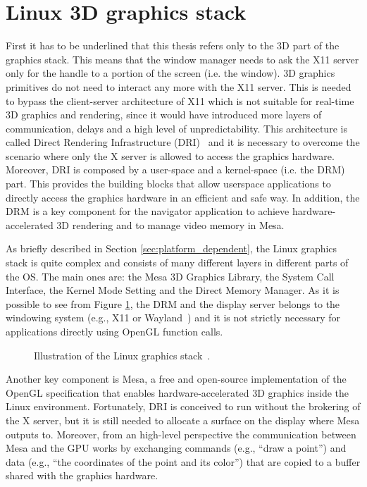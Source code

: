 \section{Linux 3D graphics stack}
First it has to be underlined that this thesis refers only to the 3D part of the
graphics stack. This means that the window manager needs to ask the X11 server
only for the handle to a portion of the screen (i.e. the window).
3D graphics primitives do not need to interact any more with the X11 server. This
is needed to bypass the client-server architecture of X11 which is not suitable for
real-time 3D graphics and rendering, since it would have introduced more layers
of communication, delays and a high level of unpredictability.
This architecture is called
Direct Rendering Infrastructure (DRI)~\cite{paul2000introduction} and it is
necessary to overcome the scenario where only the X server is allowed to access
the graphics hardware. Moreover, DRI is composed by a user-space and a kernel-space
(i.e. the DRM) part. This provides the building blocks that allow userspace applications
to directly access the graphics hardware in an efficient and safe way.
In addition, the DRM is a key component for the navigator application to achieve
hardware-accelerated 3D rendering and to manage video memory in Mesa.

As briefly described in Section \ref{sec:platform_dependent}, the Linux graphics
stack is quite complex and consists of many different layers in different parts
of the OS. The main ones are: the Mesa 3D Graphics Library, the System Call
Interface, the Kernel Mode Setting and the Direct Memory Manager.
As it is possible to see from Figure \ref{img:linux_graphics_stack}, the DRM and 
the display server belongs to the windowing system (e.g., X11 or Wayland~\cite{wayland})
and it is not strictly necessary for applications directly using OpenGL function
calls.
\begin{figure}[!htb]
    \caption{Illustration of the Linux graphics stack~\cite{fig_linux_graphics_stack}.}
    \label{img:linux_graphics_stack}
\end{figure}

Another key component is Mesa, a free and open-source implementation of the
OpenGL specification that enables hardware-accelerated 3D graphics inside the
Linux environment. Fortunately,
DRI is conceived to run without the brokering of the X server, but it is still
needed to allocate a surface on the display where Mesa outputs to. Moreover, from
an high-level perspective the communication between Mesa and the GPU works by
exchanging commands (e.g., ``draw a point'') and data (e.g., ``the coordinates of the
point and its color'') that are copied to a buffer shared with the graphics hardware.


